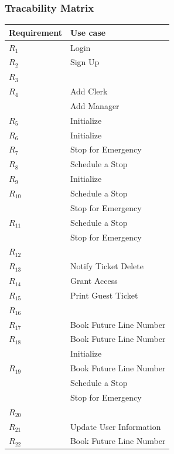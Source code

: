 \subsubsection{Tracability Matrix}
\begin{table}[H]
    \begin{tabular}{|p{8cm}|p{8cm}|}
        \hline
        \textbf{Requirement} & \textbf{Use case} \\ \hline
        $R_{1}$ & Login\\ \hline
        $R_{2}$ & Sign Up\\ \hline
        $R_{3}$ & \\ \hline
        $R_{4}$ & Add Clerk\\
        & Add Manager \\ \hline
        $R_{5}$ & Initialize \\ \hline
        $R_{6}$ & Initialize \\ \hline
        $R_{7}$ & Stop for Emergency\\ \hline
        $R_{8}$ & Schedule a Stop\\ \hline
        $R_{9}$ & Initialize \\ \hline
        $R_{10}$ & Schedule a Stop\\
        & Stop for Emergency \\ \hline
        $R_{11}$ & Schedule a Stop\\
        & Stop for Emergency\\ \hline
        $R_{12}$ & \\ \hline
        $R_{13}$ & Notify Ticket Delete \\ \hline
        $R_{14}$ & Grant Access \\ \hline
        $R_{15}$ & Print Guest Ticket \\ \hline
        $R_{16}$ & \\ \hline
        $R_{17}$ & Book Future Line Number\\ \hline
        $R_{18}$ & Book Future Line Number\\
        & Initialize \\ \hline
        $R_{19}$ & Book Future Line Number \\
        & Schedule a Stop \\
        & Stop for Emergency\\ \hline
        $R_{20}$ & \\ \hline
        $R_{21}$ & Update User Information\\ \hline
        $R_{22}$ & Book Future Line Number\\ \hline

\end{tabular}
\end{table}
